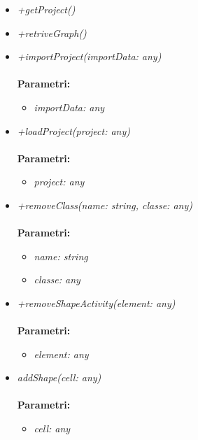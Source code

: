 \begin{itemize}
\begin{itemize}
\begin{itemize}
    		\end{itemize}
    		\item \emph{+getProject()}\\
    		
    		\item \emph{+retriveGraph()}\\
    		
    		\item \emph{+importProject(importData: any)}\\
    		\\
    		\textbf{Parametri:}
    		\begin{itemize}
    			\item \emph{importData: any}\\
    			
    		\end{itemize}
    		\item \emph{+loadProject(project: any)}\\
    		\\
    		\textbf{Parametri:}
    		\begin{itemize}
    			\item \emph{project: any}\\
    			
    		\end{itemize}
    		\item \emph{+removeClass(name: string, classe: any)}\\
    		\\
    		\textbf{Parametri:}
    		\begin{itemize}
    			\item \emph{name: string}\\
    			
    			\item \emph{classe: any}\\
    			
    		\end{itemize}
    		\item \emph{+removeShapeActivity(element: any)}\\
    		\\
    		\textbf{Parametri:}
    		\begin{itemize}
    			\item \emph{element: any}\\
    			
    		\end{itemize}
    		\item \emph{addShape(cell: any)}\\
    		\\
    		\textbf{Parametri:}
    		\begin{itemize}
    			\item \emph{cell: any}\\
    			

\end{itemize}
\end{itemize}
\end{itemize}

